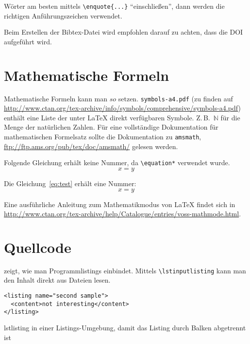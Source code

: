 Wörter am besten mittels \texttt{\textbackslash enquote\{...\}} \enquote{einschließen}, dann werden die richtigen Anführungszeichen verwendet.

Beim Erstellen der Bibtex-Datei wird empfohlen darauf zu achten, dass die DOI aufgeführt wird.

\section{Mathematische Formeln}
\label{sec:mf}
Mathematische Formeln kann man $so$ setzen. \texttt{symbols-a4.pdf} (zu finden auf \url{http://www.ctan.org/tex-archive/info/symbols/comprehensive/symbols-a4.pdf}) enthält eine Liste der unter LaTeX direkt verfügbaren Symbole.
Z.\,B.\ $\mathbb{N}$ für die Menge der natürlichen Zahlen.
Für eine vollständige Dokumentation für mathematischen Formelsatz sollte die Dokumentation zu \texttt{amsmath}, \url{ftp://ftp.ams.org/pub/tex/doc/amsmath/} gelesen werden.

Folgende Gleichung erhält keine Nummer, da \texttt{\textbackslash equation*} verwendet wurde.
\begin{equation*}
x = y
\end{equation*}

Die Gleichung~\ref{eq:test} erhält eine Nummer:
\begin{equation}
\label{eq:test}
x = y
\end{equation}

Eine ausführliche Anleitung zum Mathematikmodus von LaTeX findet sich in \url{http://www.ctan.org/tex-archive/help/Catalogue/entries/voss-mathmode.html}.

\section{Quellcode}
 zeigt, wie man Programmlistings einbindet.
Mittels \texttt{\textbackslash lstinputlisting} kann man den Inhalt direkt aus Dateien lesen.

\begin{Listing}
\begin{lstlisting}
<listing name="second sample">
  <content>not interesting</content>
</listing>
\end{lstlisting}
\caption{lstlisting in einer Listings-Umgebung, damit das Listing durch Balken abgetrennt ist}
\label{lst:ListingANDlstlisting}
\end{Listing}

